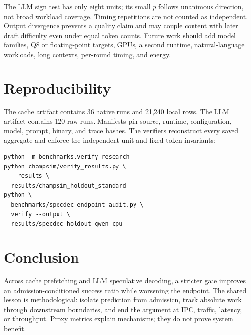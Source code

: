 \documentclass[conference]{IEEEtran}
\begin{document}
The LLM sign test has only eight units; its small $p$ follows unanimous
direction, not broad workload coverage. Timing repetitions are not counted as
independent. Output divergence prevents a quality claim and may couple content
with later draft difficulty even under equal token counts. Future work should
add model families, Q8 or floating-point targets, GPUs, a second runtime,
natural-language workloads, long contexts, per-round timing, and energy.

\section{Reproducibility}
The cache artifact contains 36 native runs and 21,240 local rows. The LLM
artifact contains 120 raw runs. Manifests pin source, runtime, configuration,
model, prompt, binary, and trace hashes. The verifiers reconstruct every saved
aggregate and enforce the independent-unit and fixed-token invariants:
\begin{verbatim}
python -m benchmarks.verify_research
python champsim/verify_results.py \
  --results \
  results/champsim_holdout_standard
python \
  benchmarks/specdec_endpoint_audit.py \
  verify --output \
  results/specdec_holdout_qwen_cpu
\end{verbatim}

\section{Conclusion}
Across cache prefetching and LLM speculative decoding, a stricter gate improves
an admission-conditioned success ratio while worsening the endpoint. The
shared lesson is methodological: isolate prediction from admission, track
absolute work through downstream boundaries, and end the argument at IPC,
traffic, latency, or throughput. Proxy metrics explain mechanisms; they do not
prove system benefit.
\end{document}
